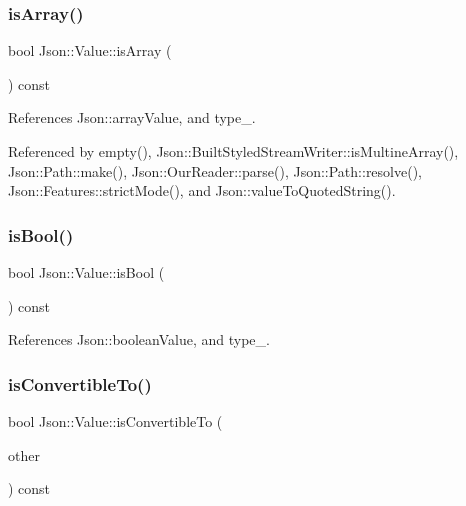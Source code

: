 \mbox{\label{classJson_1_1Value_a1627eb9d6568d6d0252fa8bb711c0a59_a1627eb9d6568d6d0252fa8bb711c0a59}} 
\subsubsection{\texorpdfstring{is\+Array()}{isArray()}}
{\footnotesize\ttfamily bool Json\+::\+Value\+::is\+Array (\begin{DoxyParamCaption}{ }\end{DoxyParamCaption}) const}



References Json\+::array\+Value, and type\+\_\+.



Referenced by empty(), Json\+::\+Built\+Styled\+Stream\+Writer\+::is\+Multine\+Array(), Json\+::\+Path\+::make(), Json\+::\+Our\+Reader\+::parse(), Json\+::\+Path\+::resolve(), Json\+::\+Features\+::strict\+Mode(), and Json\+::value\+To\+Quoted\+String().

\mbox{\label{classJson_1_1Value_ab1f02651cb89d0f18b63a036959391ba_ab1f02651cb89d0f18b63a036959391ba}} 
\subsubsection{\texorpdfstring{is\+Bool()}{isBool()}}
{\footnotesize\ttfamily bool Json\+::\+Value\+::is\+Bool (\begin{DoxyParamCaption}{ }\end{DoxyParamCaption}) const}



References Json\+::boolean\+Value, and type\+\_\+.

\mbox{\label{classJson_1_1Value_af1ee6be27a96a7d12128efdd60deb54d_af1ee6be27a96a7d12128efdd60deb54d}} 
\subsubsection{\texorpdfstring{is\+Convertible\+To()}{isConvertibleTo()}}
{\footnotesize\ttfamily bool Json\+::\+Value\+::is\+Convertible\+To (\begin{DoxyParamCaption}\item[{\hyperlink{namespaceJson_a7d654b75c16a57007925868e38212b4e_a7d654b75c16a57007925868e38212b4e}{Value\+Type}}]{other }\end{DoxyParamCaption}) const}



